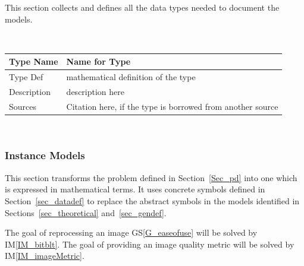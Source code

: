 \documentclass[12pt]{article}
\newcommand{\colAwidth}{0.13\textwidth}
\newcommand{\colBwidth}{0.82\textwidth}
\newcommand{\gsref}[1]{GS\ref{#1}}
\newcommand{\iref}[1]{IM\ref{#1}}
\begin{document}


This section collects and defines all the data types needed to document the
models. 

~\newline

\noindent
\begin{minipage}{\textwidth}
\renewcommand*{\arraystretch}{1.5}
\begin{tabular}{| p{\colAwidth} | p{\colBwidth}|}
  \hline
  \rowcolor[gray]{0.9}
  Type Name & Name for Type\\
  \hline
  Type Def & mathematical definition of the type\\
  \hline
  Description & description here
  \\
  \hline
  Sources & Citation here, if the type is borrowed from another source\\
  \hline
\end{tabular}
\end{minipage}\\

\subsubsection{Instance Models} \label{sec_instance}    

This section transforms the problem defined in Section~\ref{Sec_pd} into 
one which is expressed in mathematical terms. It uses concrete symbols defined 
in Section~\ref{sec_datadef} to replace the abstract symbols in the models 
identified in Sections~\ref{sec_theoretical} and~\ref{sec_gendef}.

The goal of reprocessing an image \gsref{G_easeofuse} will be solved by \iref{IM_bitblt}. The goal of providing an image quality metric will be solved by \iref{IM_imageMetric}.  

~\newline

\end{document}
